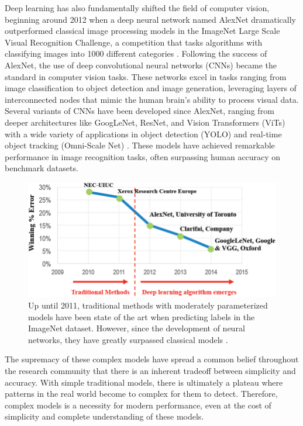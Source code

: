 \documentclass[10pt]{article}
\begin{document}
    Deep learning has also fundamentally shifted the field of computer vision, beginning around 2012 when a deep neural network named AlexNet dramatically outperformed classical image processing models in the ImageNet Large Scale Visual Recognition Challenge, a competition that tasks algorithms with classifying images into 1000 different categories \cite{alexnet}. Following the success of AlexNet, the use of deep convolutional neural networks (CNNs) became the standard in computer vision tasks. These networks excel in tasks ranging from image classification to object detection and image generation, leveraging layers of interconnected nodes that mimic the human brain's ability to process visual data. Several variants of CNNs have been developed since AlexNet, ranging from deeper architectures like GoogLeNet, ResNet, and Vision Transformers (ViTs) with a wide variety of applications in object detection (YOLO) and real-time object tracking (Omni-Scale Net) \cite{lenet, resnet, vit, yolo, osnet}. These models have achieved remarkable performance in image recognition tasks, often surpassing human accuracy on benchmark datasets.

    \begin{figure}[H]
      \centering 
      \includegraphics[scale=0.4]{img/imagenet.png}
      \caption{Up until 2011, traditional methods with moderately parameterized models have been state of the art when predicting labels in the ImageNet dataset. However, since the development of neural networks, they have greatly surpassed classical models \cite{imagenet}.} 
      \label{fig:imagenet}
    \end{figure}

    The supremacy of these complex models have spread a common belief throughout the research community that there is an inherent tradeoff between simplicity and accuracy. With simple traditional models, there is ultimately a plateau where patterns in the real world become to complex for them to detect. Therefore, complex models is a necessity for modern performance, even at the cost of simplicity and complete understanding of these models. 
\end{document}
